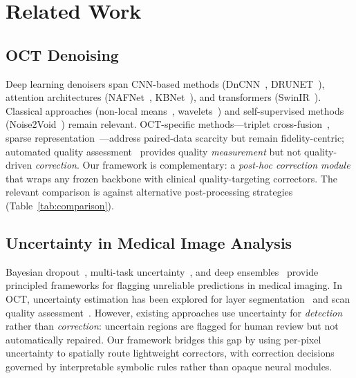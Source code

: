 \documentclass[journal,twoside,web]{ieeecolor}
\begin{document}
\section{Related Work}
\label{sec:related}

\subsection{OCT Denoising}
Deep learning denoisers span CNN-based methods (DnCNN~\cite{zhang2017beyond}, DRUNET~\cite{devalla2018drunet}), attention architectures (NAFNet~\cite{chen2022simple}, KBNet~\cite{zhang2023kbnet}), and transformers (SwinIR~\cite{liang2021swinir}). Classical approaches (non-local means~\cite{buades2005non}, wavelets~\cite{mayer2012wavelet}) and self-supervised methods (Noise2Void~\cite{krull2019noise2void}) remain relevant. OCT-specific methods---triplet cross-fusion~\cite{geng2022triplet}, sparse representation~\cite{fang2012sparsity,fang2013fast}---address paired-data scarcity but remain fidelity-centric; automated quality assessment~\cite{wang2019quality} provides quality \emph{measurement} but not quality-driven \emph{correction}. Our framework is complementary: a \emph{post-hoc correction module} that wraps any frozen backbone with clinical quality-targeting correctors. The relevant comparison is against alternative post-processing strategies (Table~\ref{tab:comparison}).

\subsection{Uncertainty in Medical Image Analysis}
Bayesian dropout~\cite{gal2016dropout}, multi-task uncertainty~\cite{kendall2018multi}, and deep ensembles~\cite{lakshminarayanan2017simple} provide principled frameworks for flagging unreliable predictions in medical imaging. In OCT, uncertainty estimation has been explored for layer segmentation~\cite{devalla2018drunet} and scan quality assessment~\cite{wang2019quality}. However, existing approaches use uncertainty for \emph{detection} rather than \emph{correction}: uncertain regions are flagged for human review but not automatically repaired. Our framework bridges this gap by using per-pixel uncertainty to spatially route lightweight correctors, with correction decisions governed by interpretable symbolic rules rather than opaque neural modules.
\end{document}
